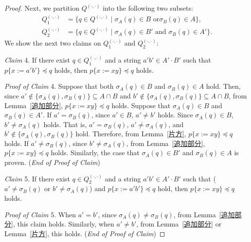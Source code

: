 \begin{proof}
Next, we partition $Q^{(\cdot,\cdot)}$ into the following two subsets:
\begin{align*}
  Q_{1}^{(\cdot,\cdot)} & = \{q \in Q^{(\cdot,\cdot)} \mid \sigma_{A}(q) \in B \mbox{ or} \sigma_{B}(q) \in A\},\\
  Q_{2}^{(\cdot,\cdot)} & = \{q \in Q^{(\cdot,\cdot)} \mid \sigma_{A}(q) \in B' \mbox{ and } \sigma_{B}(q) \in A'\}.
\end{align*}
We show the next two claims on $Q_{1}^{(\cdot,\cdot)}$ and $Q_{2}^{(\cdot,\cdot)}$:

\smallskip

\noindent
\textit{Claim} 4.
If there exist $q \in Q_{1}^{(\cdot,\cdot)}$ and a string $a'b' \in A'\cdot B'$ such that $p\{x:=a'b'\} \preceq q$ holds, then $p\{x:=xy\} \preceq q$ holds.

\smallskip

\noindent
\textit{Proof of Claim} 4.
Suppose that both $\sigma_{A}(q) \in B$ and $\sigma_{B}(q) \in A$ hold. Then, since $a' \not\in \{\sigma_{A}(q), \sigma_{B}(q)\} \subseteq A\cap B$ and $b' \not\in \{\sigma_{A}(q), \sigma_{B}(q)\} \subseteq A\cap B$, from Lemma~\ref{追加部分}, $p\{x:=xy\} \preceq q$ holds.
Suppose that $\sigma_{A}(q)\in B$ and $\sigma_{B}(q)\in A'$.
If $a' = \sigma_{B}(q)$, since $a' \in B$, $a' \not= b'$ holds.
Since $\sigma_{A}(q)\in B$, $b' \not= \sigma_{A}(q)$ holds.
That is, $a' = \sigma_{B}(q)$, $a' \not= \sigma_{A}(q)$, and $b' \not\in \{\sigma_{A}(q), \sigma_{B}(q)\}$ hold.
Therefore, from Lemma~\ref{片方}, $p\{x:=xy\} \preceq q$ holds.
If $a' \not= \sigma_{B}(q)$, since $b' \not= \sigma_{A}(q)$, from Lemma~\ref{追加部分}, $p\{x:=xy\} \preceq q$ holds.
Similarly, the case that $\sigma_{A}(q)\in B'$ and $\sigma_{B}(q)\in A$ is proven. (\textit{End of Proof of Claim})

\smallskip

\noindent
\textit{Claim} 5.
If there exist $q \in Q_{2}^{(\cdot,\cdot)}$ and a string $a'b' \in A'\cdot B'$ such that ($a' \not= \sigma_{B}(q)$ or $b' \not= \sigma_{A}(q)$) and $p\{x:=a'b'\} \preceq q$ hold, then $p\{x:=xy\} \preceq q$ holds.
 
\smallskip

\noindent
\textit{Proof of Claim} 5.
When $a'=b'$, since $\sigma_{A}(q) \not= \sigma_{B}(q)$, from Lemma~\ref{追加部分}, this claim holds. Similarly, when $a' \not = b'$, from Lemma~\ref{追加部分} or Lemma~\ref{片方}, this holds.  (\textit{End of Proof of Claim})
  
\smallskip


\end{proof}
